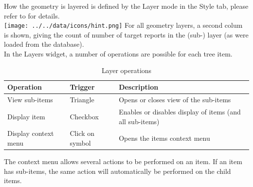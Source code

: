 How the geometry is layered is defined by the Layer mode in the Style tab, please refer to  for details. \\
 
\texttt{[image: ../../data/icons/hint.png]} For all geometry layers, a second colum is shown, giving the count of number of target reports in the (sub-) layer (as were loaded from the database). \\
 
In the Layers widget, a number of operations are possible for each tree item.

\begin{table}[H]
  \center
  \begin{tabular}{ | l | l | l |}
    \hline
    \textbf{Operation} & \textbf{Trigger} &  \textbf{Description} \\ \hline
    View sub-items & Triangle & Opens or closes view of the sub-items \\ \hline
    Display item & Checkbox & Enables or disables display of items (and all sub-items) \\ \hline
    Display context menu & Click on symbol & Opens the items context menu \\ \hline
  \end{tabular}
  \caption{Layer operations}
\end{table}

The context menu allows several actions to be performed on an item. If an item has sub-items, the same action will automatically be performed on the child items.












